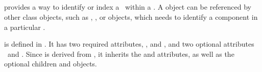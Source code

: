 \clearpage

\subsection{}
\label{def:SpeciesTypeComponentIndex}

 provides a way to identify or index a \component\ within a \speciesType. A  object can be referenced by other class objects, such as \InSpeciesTypeBond, \OutwardBindingSite, \SpeciesFeature or \SpeciesTypeComponentMapInProduct objects, which needs to identify a component in a particular \speciesType. 

 is defined in . It has two required attributes, \idAtt, and \componentAtt, and two optional attributes \nameAtt\ and \identifyingParentAtt.  Since  is derived from , it inherits the  and  attributes, as well as the optional children  and  objects. 


